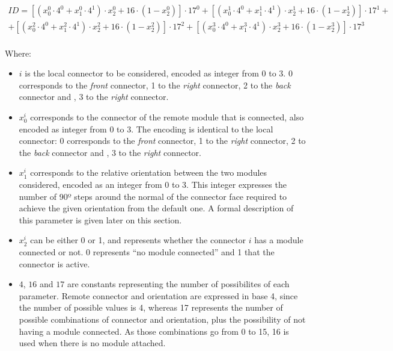 \begin{equation} \label{eq:ID_calculation_extended}
\begin{split}
ID = [( x_0^0 \cdot 4^0+ x_1^0 \cdot 4^1) \cdot x_2^0 + 16 \cdot (1-x_2^0)] \cdot 17^0 + [( x_0^1 \cdot 4^0+ x_1^1 \cdot 4^1) \cdot x_2^1 + 16 \cdot (1-x_2^1)] \cdot 17^1 + \\
 + [( x_0^2 \cdot 4^0+ x_1^2 \cdot 4^1) \cdot x_2^2 + 16 \cdot (1-x_2^2)] \cdot 17^2 + [( x_0^3 \cdot 4^0+ x_1^3 \cdot 4^1) \cdot x_2^3 + 16 \cdot (1-x_2^3)] \cdot 17^3
\end{split}
\end{equation}
~\\
Where:
\begin{itemize}
	\item $i$ is the local connector to be considered, encoded as integer from 0 to 3. 0 corresponds to the \emph{front} connector, 1 to the \emph{right} connector, 2 to the \emph{back} connector and , 3 to the \emph{right} connector.
	\item $x_0^i$ corresponds to the connector of the remote module that is connected, also encoded as integer from 0 to 3. The encoding is identical to the local connector: 0 corresponds to the \emph{front} connector, 1 to the \emph{right} connector, 2 to the \emph{back} connector and , 3 to the \emph{right} connector.
	\item $x_1^i$ corresponds to the relative orientation between the two modules considered, encoded as an integer from 0 to 3. This integer expresses the number of 90º steps around the normal of the connector face required to achieve the given orientation from the default one. A formal description of this parameter is given later on this section.
	\item $x_2^i$ can be either 0 or 1, and represents whether the connector $i$ has a module connected or not. 0 represents ``no module connected'' and 1 that the connector is active.
	\item $4$, $16$ and $17$ are constants representing the number of possibilites of each parameter. Remote connector and orientation are expressed in base 4, since the number of possible values is 4, whereas 17 represents the number of possible combinations of connector and orientation, plus the possibility of not having a module connected. As those combinations go from 0 to 15, 16 is used when there is no module attached.
\end{itemize}


